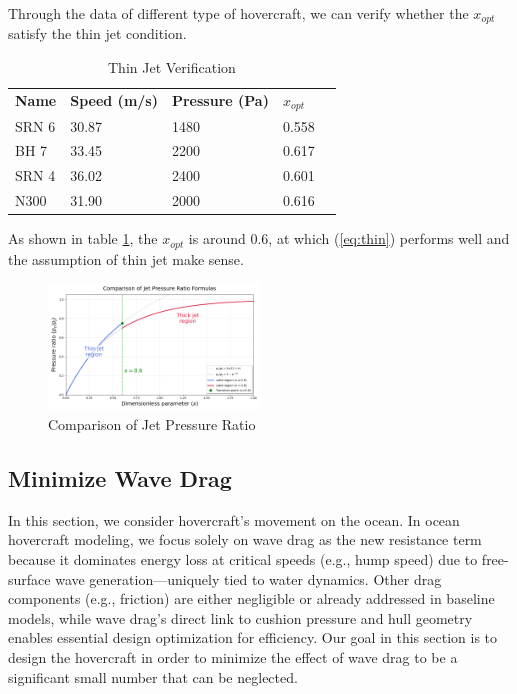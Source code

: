 Through the data of different type of hovercraft, we can verify whether the $x_{opt}$ satisfy the thin jet condition.

\begin{table}[h]
\centering
\caption{Thin Jet Verification}
\begin{tabular}{lllll}
\toprule
\textbf{Name} & \textbf{Speed (m/s)} & \textbf{Pressure (Pa)} & \textbf{$x_{opt}$} \\
SRN 6 & 30.87 & 1480 &  0.558 \\
BH 7 & 33.45 & 2200 &  0.617 \\
SRN 4 & 36.02 & 2400 & 0.601 \\
N300 & 31.90 & 2000 & 0.616 \\
\end{tabular}
\label{tab:thinjet}
\end{table}


As shown in table \ref{tab:thinjet}, the $x_{opt}$ is around 0.6, at which (\ref{eq:thin}) performs well and the assumption of thin jet make sense.

\begin{figure}[H]
  \centering
  \includegraphics[width=0.5\textwidth]{images/compare.png}
  \caption{Comparison of Jet Pressure Ratio}
  \label{fig:compare}
\end{figure}

\subsection{Minimize Wave Drag}
\label{sec:wave drag}
In this section, we consider hovercraft's movement on the ocean. In ocean hovercraft modeling, we focus solely on wave drag as the new resistance term because it dominates energy loss at critical speeds (e.g., hump speed) due to free-surface wave generation—uniquely tied to water dynamics. Other drag components (e.g., friction) are either negligible or already addressed in baseline models, while wave drag’s direct link to cushion pressure and hull geometry enables essential design optimization for efficiency. Our goal in this section is to design the hovercraft in order to minimize the effect of wave drag to be a significant small number that can be neglected.

